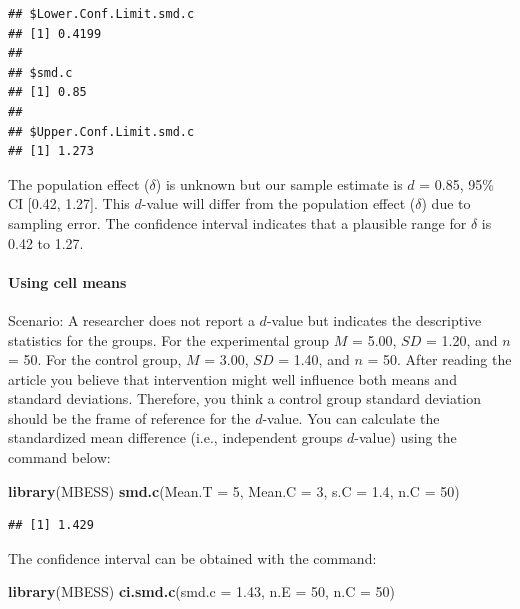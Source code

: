 \documentclass[
]{krantz}
\makeatletter
\newenvironment{Shaded}{\begin{snugshade}}{\end{snugshade}}
\newcommand{\DataTypeTok}[1]{\textcolor[rgb]{0.27,0.27,0.27}{#1}}
\newcommand{\DecValTok}[1]{\textcolor[rgb]{0.06,0.06,0.06}{#1}}
\newcommand{\FloatTok}[1]{\textcolor[rgb]{0.06,0.06,0.06}{#1}}
\newcommand{\KeywordTok}[1]{\textcolor[rgb]{0.27,0.27,0.27}{\textbf{#1}}}
\newcommand{\NormalTok}[1]{#1}
\newenvironment{kframe}{%
\medskip{}
\setlength{\fboxsep}{.8em}
 \def\at@end@of@kframe{}%
 \ifinner\ifhmode%
  \def\at@end@of@kframe{\end{minipage}}%
  \begin{minipage}{\columnwidth}%
 \fi\fi%
 \def\FrameCommand##1{\hskip\@totalleftmargin \hskip-\fboxsep
 \colorbox{shadecolor}{##1}\hskip-\fboxsep
     \hskip-\linewidth \hskip-\@totalleftmargin \hskip\columnwidth}%
 \MakeFramed {\advance\hsize-\width
   \@totalleftmargin\z@ \linewidth\hsize
   \@setminipage}}%
 {\par\unskip\endMakeFramed%
 \at@end@of@kframe}
\renewenvironment{Shaded}{\begin{kframe}}{\end{kframe}}
\makeatother
\begin{document}
\begin{verbatim}
## $Lower.Conf.Limit.smd.c
## [1] 0.4199
## 
## $smd.c
## [1] 0.85
## 
## $Upper.Conf.Limit.smd.c
## [1] 1.273
\end{verbatim}

The population effect (\(\delta\)) is unknown but our sample estimate is \(d\) = 0.85, 95\% CI {[}0.42, 1.27{]}. This \(d\)-value will differ from the population effect (\(\delta\)) due to sampling error. The confidence interval indicates that a plausible range for \(\delta\) is 0.42 to 1.27.

\hypertarget{using-cell-means}{%
\paragraph{Using cell means}\label{using-cell-means}}

Scenario: A researcher does not report a \(d\)-value but indicates the descriptive statistics for the groups. For the experimental group \(M\) = 5.00, \(SD\) = 1.20, and \(n\) = 50. For the control group, \(M\) = 3.00, \(SD\) = 1.40, and \(n\) = 50. After reading the article you believe that intervention might well influence both means and standard deviations. Therefore, you think a control group standard deviation should be the frame of reference for the \(d\)-value. You can calculate the standardized mean difference (i.e., independent groups \(d\)-value) using the command below:

\begin{Shaded}
\begin{Highlighting}[]
\KeywordTok{library}\NormalTok{(MBESS)}
\KeywordTok{smd.c}\NormalTok{(}\DataTypeTok{Mean.T =} \DecValTok{5}\NormalTok{,}
    \DataTypeTok{Mean.C =} \DecValTok{3}\NormalTok{, }
    \DataTypeTok{s.C =} \FloatTok{1.4}\NormalTok{, }
    \DataTypeTok{n.C =} \DecValTok{50}\NormalTok{) }
\end{Highlighting}
\end{Shaded}

\begin{verbatim}
## [1] 1.429
\end{verbatim}

The confidence interval can be obtained with the command:

\begin{Shaded}
\begin{Highlighting}[]
\KeywordTok{library}\NormalTok{(MBESS)}
\KeywordTok{ci.smd.c}\NormalTok{(}\DataTypeTok{smd.c =} \FloatTok{1.43}\NormalTok{, }\DataTypeTok{n.E =} \DecValTok{50}\NormalTok{, }\DataTypeTok{n.C =} \DecValTok{50}\NormalTok{) }
\end{Highlighting}
\end{Shaded}
\end{document}
